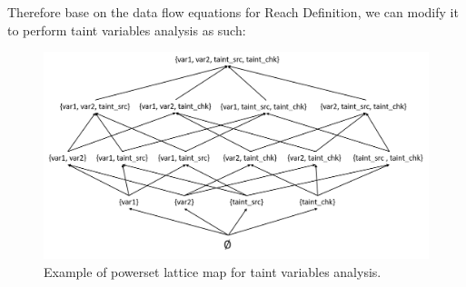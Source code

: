 \documentclass[english,12pt]{article}
\begin{document}
	Therefore base on the data flow equations for Reach Definition, we can modify it to perform taint variables analysis as such:
	\begin{figure}
		\centering
		\includegraphics[width=.8\textwidth]{powerset_lattice}
		\par
		\caption{Example of powerset lattice map for taint variables analysis. \label{fig:powerset_lattice}}
	\end{figure}
\end{document}
